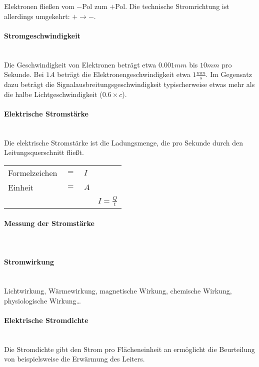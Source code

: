 \noindent Elektronen fließen vom $-$Pol zum $+$Pol. Die technische Stromrichtung ist allerdings umgekehrt: $+ \to -$.		
		
		\paragraph{Stromgeschwindigkeit}~\\
		
\noindent Die Geschwindigkeit von Elektronen beträgt etwa $0.001mm$ bis $10mm$ pro Sekunde. Bei $1A$ beträgt die Elektronengeschwindigkeit etwa $1\frac{mm}{s}$. Im Gegensatz dazu beträgt die Signalausbreitungsgeschwindigkeit typischerweise etwas mehr als die halbe Lichtgeschwindigkeit ($0.6\times c$).
	
		\paragraph{Elektrische Stromstärke}~\\
		
\noindent Die elektrische Stromstärke ist die Ladungsmenge, die pro Sekunde durch den Leitungsquerschnitt fließt.

\begin{tabular}{llll}
Formelzeichen	& $=$ & $I$ &\\
Einheit			& $=$ & $A$ &\\
& & & $I = \frac{Q}{t}$\\
\end{tabular}	
		
		\paragraph{Messung der Stromstärke}~\\
		\paragraph{Stromwirkung}~\\
		
\noindent Lichtwirkung, Wärmewirkung, magnetische Wirkung, chemische Wirkung, physiologische Wirkung\dots		
		
		\paragraph{Elektrische Stromdichte}~\\
		
\noindent Die Stromdichte gibt den Strom pro Flächeneinheit an ermöglicht die Beurteilung von beispielsweise die Erwärmung des Leiters.	

